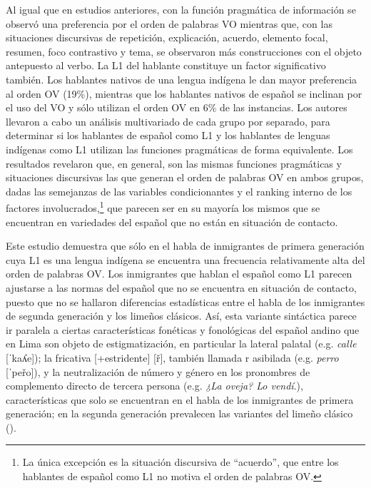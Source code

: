 \documentclass[output=paper]{langscibook}
\begin{document}
Al igual que en estudios anteriores, con la función pragmática de información se observó una preferencia por el orden de palabras VO mientras que, con las situaciones discursivas de repetición, explicación, acuerdo, elemento focal, resumen, foco contrastivo y tema, se observaron más construcciones con el objeto antepuesto al verbo. La L1 del hablante constituye un factor significativo también. Los hablantes nativos de una lengua indígena le dan mayor preferencia al orden OV (19\%), mientras que los hablantes nativos de español se inclinan por el uso del VO y sólo utilizan el orden OV en 6\% de las instancias. Los autores llevaron a cabo un análisis multivariado de cada grupo por separado, para determinar si los hablantes de español como L1 y los hablantes de lenguas indígenas como L1 utilizan las funciones pragmáticas de forma equivalente. Los resultados revelaron que, en general, son las mismas funciones pragmáticas y situaciones discursivas las que generan el orden de palabras OV en ambos grupos, dadas las semejanzas de las variables condicionantes y el ranking interno de los factores involucrados,\footnote{La única excepción es la situación discursiva de “acuerdo”, que entre los hablantes de español como L1 no motiva el orden de palabras OV.} que parecen ser en su mayoría los mismos que se encuentran en variedades del español que no están en situación de contacto.

Este estudio demuestra que sólo en el habla de inmigrantes de primera generación cuya L1 es una lengua indígena se encuentra una frecuencia relativamente alta del orden de palabras OV. Los inmigrantes que hablan el español como L1 parecen ajustarse a las normas del español que no se encuentra en situación de contacto, puesto que no se hallaron diferencias estadísticas entre el habla de los inmigrantes de segunda generación y los limeños clásicos. Así, esta variante sintáctica parece ir paralela a ciertas características fonéticas y fonológicas del español andino que en Lima son objeto de estigmatización, en particular la lateral palatal (e.g. \emph {calle} [ˈkaʎe]); la fricativa [+estridente] [ř], también llamada r asibilada (e.g. \emph {perro} [ˈpeřo]), y la neutralización de número y género en los pronombres de complemento directo de tercera persona (e.g. \emph {¿La oveja? Lo vendí}.), características que solo se encuentran en el habla de los inmigrantes de primera generación; en la segunda generación prevalecen las variantes del limeño clásico (\citealt{KleeCaravedo2006}).
\end{document}
